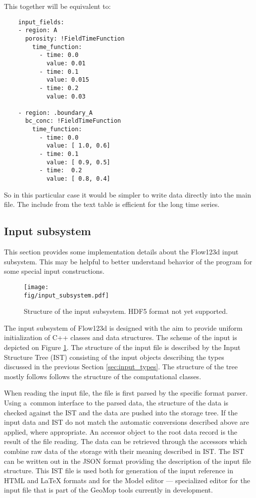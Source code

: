 This together will be equivalent to:
\begin{verbatim}
    input_fields:
    - region: A
      porosity: !FieldTimeFunction
        time_function: 
          - time: 0.0
            value: 0.01
          - time: 0.1
            value: 0.015
          - time: 0.2
            value: 0.03
           
    - region: .boundary_A        
      bc_conc: !FieldTimeFunction
        time_function: 
          - time: 0.0
            value: [ 1.0, 0.6]
          - time: 0.1
            value: [ 0.9, 0.5]
          - time:  0.2
            value: [ 0.8, 0.4]
\end{verbatim}

So in this particular case it would be simpler to write data directly into the main file. The include from 
the text table is efficient for the long time series.




\subsection{Input subsystem}
This section provides some implementation details about the Flow123d input subsystem. This may be helpful to better understand behavior of the program for 
some special input constructions.

\begin{figure}[!hb]
 \begin{center}
 \texttt{[image: \\fig/input\_subsystem.pdf]}
 \caption{Structure of the input subsystem. HDF5 format not yet supported.}
 \label{fig:input_subsystem}
 \end{center}
\end{figure}

The input subsystem of Flow123d is designed with the aim to provide uniform initialization of 
C++ classes and data structures. The scheme of the input is depicted on Figure \ref{fig:input_subsystem}.
The structure of the input file is described by the Input Structure Tree (IST) consisting of the input objects describing 
the types discussed in the previous Section \ref{sec:input_types}. The structure of the tree mostly follows follows the structure of the computational classes.

When reading the input file, the file is first parsed by the specific format parser. Using a~common interface to the parsed data, the 
structure of the data is checked against the IST and the data are pushed into the storage tree. If the input data and IST do not match
the automatic conversions described above are applied, where appropriate.
An accessor object to the root data record is the result of the file reading. The data can be retrieved through the 
accessors which combine raw data of the storage with their meaning described in IST. The IST can be written out in the JSON format
providing the description of the input file structure. This IST file is used both for generation of the input reference in HTML and \LaTeX
formats and for the Model editor --- specialized editor for the input file that is part of the GeoMop tools currently in development.

